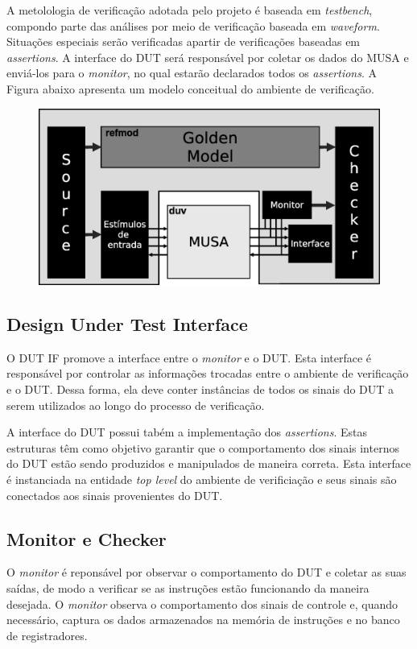 \documentclass{article}
\begin{document}
  A metolologia de verificação adotada pelo projeto é baseada em \textit{testbench}, compondo parte das análises por meio de verificação baseada em \textit{waveform}. Situações especiais serão verificadas apartir de verificações baseadas em \textit{assertions}. A interface do DUT será responsável por coletar os dados do MUSA e enviá-los para o \textit{monitor}, no qual estarão declarados todos os \textit{assertions}. A Figura abaixo apresenta um modelo conceitual do ambiente de verificação.
		
	\begin{figure}[H]
    	\centering
    	\includegraphics[width=.7\linewidth]{pictures/ver_model.eps}
  	\end{figure} 

	\subsection{Design Under Test Interface}
	
	O DUT IF promove a interface entre o \textit{monitor} e o DUT. Esta interface é responsável por controlar as informações trocadas entre o ambiente de verificação e o DUT. Dessa forma, ela deve conter instâncias de todos os sinais do DUT a serem utilizados ao longo do processo de verificação.
	
  A interface do DUT possui tabém a implementação dos \textit{assertions}. Estas estruturas têm como objetivo garantir que o comportamento dos sinais internos do DUT estão sendo produzidos e manipulados de maneira correta. Esta interface é instanciada na entidade \textit{top level} do ambiente de verificiação e seus sinais são conectados aos sinais provenientes do DUT.

	\subsection{Monitor e Checker}
	
  O \textit{monitor} é reponsável por observar o comportamento do DUT e coletar as suas saídas, de modo a verificar se as instruções estão funcionando da maneira desejada. O \textit{monitor} observa o comportamento dos sinais de controle e, quando necessário, captura os dados armazenados na memória de instruções e no banco de registradores.
	
\end{document}
